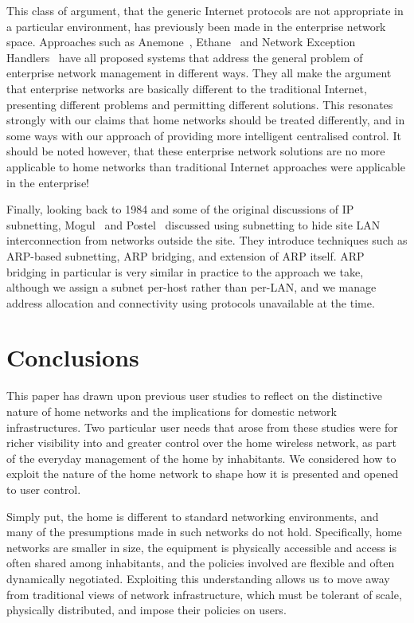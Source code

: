 This class of argument, that the generic Internet protocols are not
appropriate in a particular environment, has previously been made in
the enterprise network space.  Approaches such as
Anemone~\cite{cooke06:_reclaim}, Ethane~\cite{casado07:_ethan} and
Network Exception Handlers~\cite{karagiannis08:_networ} have all
proposed systems that address the general problem of enterprise
network management in different ways.  They all make the argument that
enterprise networks are basically different to the traditional
Internet, presenting different problems and permitting different
solutions.  This resonates strongly with our claims that home networks
should be treated differently, and in some ways with our approach of
providing more intelligent centralised control.  It should be noted
however, that these enterprise network solutions are no more
applicable to home networks than traditional Internet approaches were
applicable in the enterprise!

Finally, looking back to 1984 and some of the original discussions of
IP subnetting, Mogul~\cite{rfc:917} and Postel~\cite{rfc:925}
discussed using subnetting to hide site LAN interconnection from
networks outside the site.  They introduce techniques
such as ARP-based subnetting, ARP bridging, and extension of ARP
itself.  ARP bridging in particular is very similar in practice to the
approach we take, although we assign a subnet
per-host rather than per-LAN, and we manage address allocation and
connectivity using protocols unavailable at the time.


\section{Conclusions}
\label{s:concl}
 
This paper has drawn upon previous user studies to reflect on the
distinctive nature of home networks and the implications for domestic
network infrastructures.  Two particular user needs that arose from
these studies were for richer visibility into and greater control over
the home wireless network, as part of the everyday management of the
home by inhabitants.  We  considered how to exploit the
nature of the home network to shape how it is presented and opened to
user control.  

Simply put, the home is different to standard networking environments,
and many of the presumptions made in such networks do not hold.
Specifically, home networks are smaller in size, the equipment is
physically accessible and access is often shared among inhabitants,
and the policies involved are flexible and often dynamically
negotiated.  Exploiting this understanding allows us to move away from
traditional views of network infrastructure, which must be tolerant of
scale, physically distributed, and impose their policies on users. 

